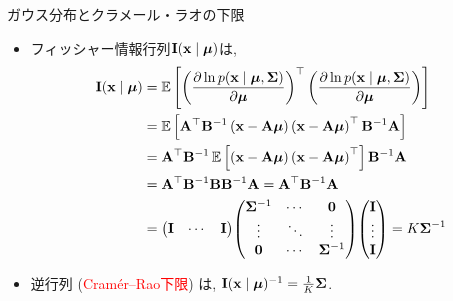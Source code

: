 \documentclass[dvipdfmx,notheorems,t]{beamer}
\begin{document}
\begin{frame}{ガウス分布とクラメール・ラオの下限}
\begin{itemize}
  \item フィッシャー情報行列$\vb{I}(\vb{x} \mid \vb*{\mu})$は,
  \begin{align*}
    \vb{I}(\vb{x} \mid \vb*{\mu}) &= \E{
      \left( \pdv{\ln p(\vb{x} \mid \vb*{\mu}, \vb{\Sigma})}{\vb*{\mu}} \right)^\top
      \left( \pdv{\ln p(\vb{x} \mid \vb*{\mu}, \vb{\Sigma})}{\vb*{\mu}} \right)} \\
      &= \E{\vb{A}^\top \vb{B}^{-1} \left( \vb{x} - \vb{A} \vb*{\mu} \right)
        \left( \vb{x} - \vb{A} \vb*{\mu} \right)^\top \vb{B}^{-1} \vb{A}} \\
      &= \vb{A}^\top \vb{B}^{-1} \E{\left( \vb{x} - \vb{A} \vb*{\mu} \right)
        \left( \vb{x} - \vb{A} \vb*{\mu} \right)^\top} \vb{B}^{-1} \vb{A} \\
      &= \vb{A}^\top \vb{B}^{-1} \vb{B} \vb{B}^{-1} \vb{A}
      = \vb{A}^\top \vb{B}^{-1} \vb{A} \\
      &= \mqty(\vb{I} & \cdots & \vb{I})
      \mqty(\vb{\Sigma}^{-1} & \cdots & \vb{0} \\
        \vdots & \ddots & \vdots \\
        \vb{0} & \cdots & \vb{\Sigma}^{-1}) \mqty(\vb{I} \\ \vdots \\ \vb{I})
      = K \vb{\Sigma}^{-1}
  \end{align*}
  \item 逆行列 (\textcolor{red}{Cramér--Rao下限}) は, $\vb{I}(\vb{x} \mid \vb*{\mu})^{-1} = \frac{1}{K} \vb{\Sigma}$.
\end{itemize}
\end{frame}
\end{document}
